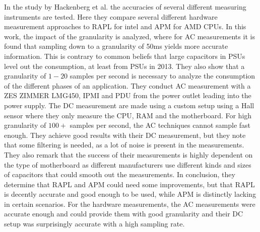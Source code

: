 In the study by Hackenberg et al.\cite{hackenberg2013} the accuracies of several different measuring instruments are tested. Here they compare several different hardware measurement approaches to RAPL for intel and APM for AMD CPUs. In this work, the impact of the granularity is analyzed, where for AC measurements it is found that sampling down to a granularity of 50ms yields more accurate information. This is contrary to common beliefs that large capacitors in PSUs level out the consumption, at least from PSUs in 2013. They also show that a granularity of $1-20$ samples per second is necessary to analyze the consumption of the different phases of an application. They conduct AC measurement with a ZES ZIMMER LMG450, IPMI and PDU from the power outlet leading into the power supply. The DC measurement are made using a custom setup using a Hall sensor where they only measure the CPU, RAM and the motherboard. For high granularity of $100+$ samples per second, the AC techniques cannot sample fast enough. They achieve good results with their DC measurement, but they note that some filtering is needed, as a lot of noise is present in the measurements. They also remark that the success of their measurements is highly dependent on the type of motherboard as different manufacturers use different kinds and sizes of capacitors that could smooth out the measurements. In conclusion, they determine that RAPL and APM could need some improvements, but that RAPL is decently accurate and good enough to be used, while APM is distinctly lacking in certain scenarios. For the hardware measurements, the AC measurements were accurate enough and could provide them with good granularity and their DC setup was surprisingly accurate with a high sampling rate.\cite*{hackenberg2013}\newline
